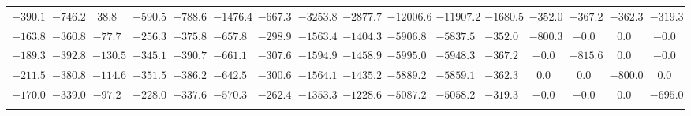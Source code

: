 \begin{tabular}{cccccccccccccccc}
$-390.1$ & $-746.2$ & $38.8$ & $-590.5$ & $-788.6$ & $-1476.4$ & $-667.3$ & $-3253.8$ & $-2877.7$ & $-12006.6$ & $-11907.2$ & $-1680.5$ & $-352.0$ & $-367.2$ & $-362.3$ & $-319.3$\\
$-163.8$ & $-360.8$ & $-77.7$ & $-256.3$ & $-375.8$ & $-657.8$ & $-298.9$ & $-1563.4$ & $-1404.3$ & $-5906.8$ & $-5837.5$ & $-352.0$ & $-800.3$ & $-0.0$ & $0.0$ & $-0.0$\\
$-189.3$ & $-392.8$ & $-130.5$ & $-345.1$ & $-390.7$ & $-661.1$ & $-307.6$ & $-1594.9$ & $-1458.9$ & $-5995.0$ & $-5948.3$ & $-367.2$ & $-0.0$ & $-815.6$ & $0.0$ & $-0.0$\\
$-211.5$ & $-380.8$ & $-114.6$ & $-351.5$ & $-386.2$ & $-642.5$ & $-300.6$ & $-1564.1$ & $-1435.2$ & $-5889.2$ & $-5859.1$ & $-362.3$ & $0.0$ & $0.0$ & $-800.0$ & $0.0$\\
$-170.0$ & $-339.0$ & $-97.2$ & $-228.0$ & $-337.6$ & $-570.3$ & $-262.4$ & $-1353.3$ & $-1228.6$ & $-5087.2$ & $-5058.2$ & $-319.3$ & $-0.0$ & $-0.0$ & $0.0$ & $-695.0$\\
\par \toprule
\end{tabular}
